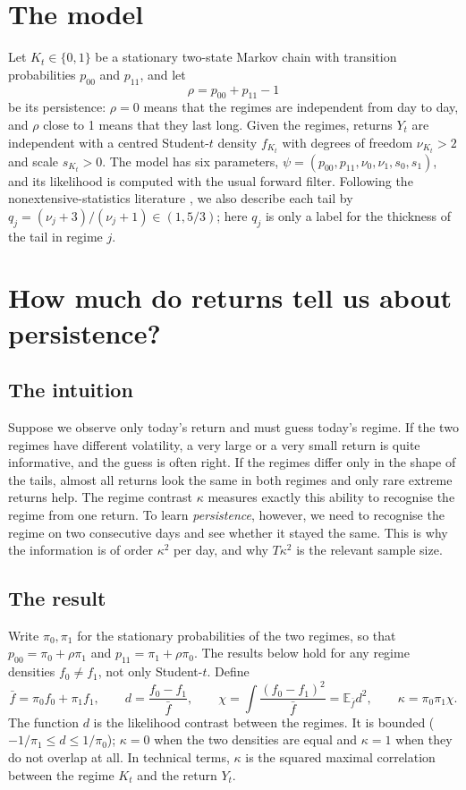 \documentclass[12pt,letterpaper]{article}
\newcommand{\E}{\mathbb{E}}
\theoremstyle{plain}
\theoremstyle{remark}
\begin{document}
\section{The model}\label{sec:model}
Let $K_t\in\{0,1\}$ be a stationary two-state Markov chain with transition probabilities $p_{00}$ and $p_{11}$, and let
\[
\rho=p_{00}+p_{11}-1
\]
be its persistence: $\rho=0$ means that the regimes are independent from day to day, and $\rho$ close to 1 means that they last long. Given the regimes, returns $Y_t$ are independent with a centred Student-$t$ density $f_{K_t}$ with degrees of freedom $\nu_{K_t}>2$ and scale $s_{K_t}>0$. The model has six parameters, $\psi=(p_{00},p_{11},\nu_0,\nu_1,s_0,s_1)$, and its likelihood is computed with the usual forward filter. Following the nonextensive-statistics literature \citep{tsallis1988,tsallis2009}, we also describe each tail by $q_j=(\nu_j+3)/(\nu_j+1)\in(1,5/3)$; here $q_j$ is only a label for the thickness of the tail in regime $j$.

\section{How much do returns tell us about persistence?}\label{sec:persist}

\subsection{The intuition}
Suppose we observe only today's return and must guess today's regime. If the two regimes have different volatility, a very large or a very small return is quite informative, and the guess is often right. If the regimes differ only in the shape of the tails, almost all returns look the same in both regimes and only rare extreme returns help. The regime contrast $\kappa$ measures exactly this ability to recognise the regime from one return. To learn \emph{persistence}, however, we need to recognise the regime on two consecutive days and see whether it stayed the same. This is why the information is of order $\kappa^2$ per day, and why $T\kappa^2$ is the relevant sample size.

\subsection{The result}
Write $\pi_0,\pi_1$ for the stationary probabilities of the two regimes, so that $p_{00}=\pi_0+\rho\pi_1$ and $p_{11}=\pi_1+\rho\pi_0$. The results below hold for any regime densities $f_0\neq f_1$, not only Student-$t$. Define
\begin{equation}\label{eq:contrast}
\bar f=\pi_0f_0+\pi_1f_1,\qquad d=\frac{f_0-f_1}{\bar f},\qquad \chi=\int\frac{(f_0-f_1)^2}{\bar f}=\E_{\bar f}d^2,\qquad \kappa=\pi_0\pi_1\chi .
\end{equation}
The function $d$ is the likelihood contrast between the regimes. It is bounded ($-1/\pi_1\le d\le1/\pi_0$); $\kappa=0$ when the two densities are equal and $\kappa=1$ when they do not overlap at all. In technical terms, $\kappa$ is the squared maximal correlation \citep{renyi1959} between the regime $K_t$ and the return $Y_t$.
\end{document}
